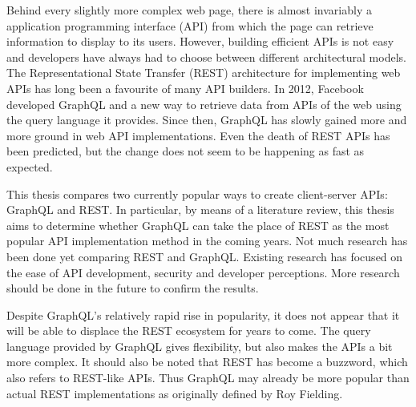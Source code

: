 \begin{abstracten}
Behind every slightly more complex web page, there is almost invariably a application programming interface (API) from which the page can retrieve information to display to its users. However, building efficient APIs is not easy and developers have always had to choose between different architectural models. The Representational State Transfer (REST) architecture for implementing web APIs has long been a favourite of many API builders. In 2012, Facebook developed GraphQL and a new way to retrieve data from APIs of the web using the query language it provides. Since then, GraphQL has slowly gained more and more ground in web API implementations. Even the death of REST APIs has been predicted, but the change does not seem to be happening as fast as expected. 

This thesis compares two currently popular ways to create client-server APIs: GraphQL and REST. In particular, by means of a literature review, this thesis aims to determine whether GraphQL can take the place of REST as the most popular API implementation method in the coming years. Not much research has been done yet comparing REST and GraphQL. Existing research has focused on the ease of API development, security and developer perceptions. More research should be done in the future to confirm the results.

Despite GraphQL's relatively rapid rise in popularity, it does not appear that it will be able to displace the REST ecosystem for years to come. The query language provided by GraphQL gives flexibility, but also makes the APIs a bit more complex. It should also be noted that REST has become a buzzword, which also refers to REST-like APIs. Thus GraphQL may already be more popular than actual REST implementations as originally defined by Roy Fielding.
\end{abstracten}